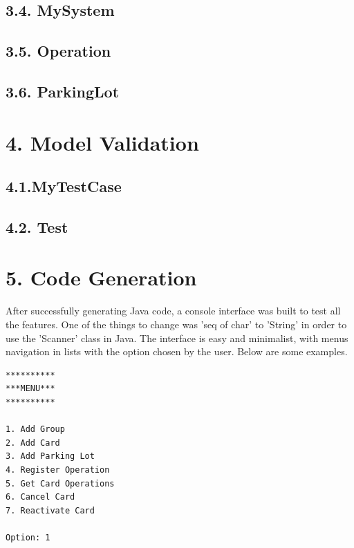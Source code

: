 \documentclass[12pt]{report}
\begin{document}
\subsection*{3.4. MySystem}

\subsection*{3.5. Operation}

\subsection*{3.6. ParkingLot}


\newpage

\section*{4. Model Validation}

\subsection*{4.1.MyTestCase}

\subsection*{4.2. Test}


\newpage
\section*{5. Code Generation}
After successfully generating Java code, a console interface was built to test all the features. One of the things to change was 'seq of char' to 'String' in order to use the 'Scanner' class in Java. The interface is easy and minimalist, with menus navigation in lists with the option chosen by the user. Below are some examples.

\begin{lstlisting}[style=DOS]
**********
***MENU***
**********

1. Add Group
2. Add Card
3. Add Parking Lot
4. Register Operation
5. Get Card Operations
6. Cancel Card
7. Reactivate Card

Option: 1
\end{lstlisting}
\end{document}

